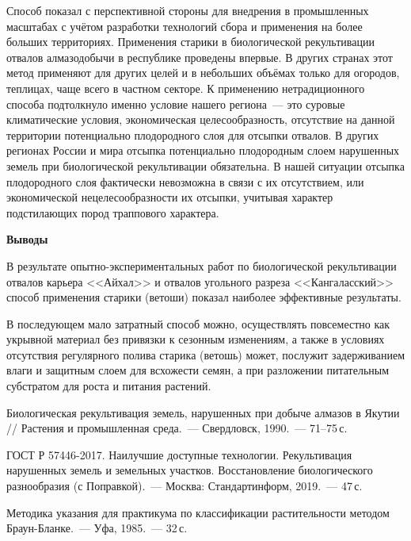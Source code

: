 Способ показал с перспективной стороны для внедрения в промышленных масштабах с учётом разработки технологий сбора и применения на более больших территориях. Применения старики в биологической рекультивации отвалов алмазодобычи в республике проведены впервые. В других странах этот метод применяют для других целей и в небольших объёмах только для огородов, теплицах, чаще всего в частном секторе. К применению нетрадиционного способа подтолкнуло именно условие нашего региона~--- это суровые климатические условия, экономическая целесообразность, отсутствие на данной территории потенциально плодородного слоя для отсыпки отвалов.
\clearpage
В других регионах России и мира отсыпка потенциально плодородным слоем нарушенных земель при биологической рекультивации обязательна. В нашей ситуации отсыпка плодородного слоя фактически невозможна в связи с их отсутствием, или экономической нецелесообразности их отсыпки, учитывая характер подстилающих пород траппового характера.

\textbf{Выводы}

В результате опытно-экспериментальных работ по биологической рекультивации отвалов карьера <<Айхал>> и отвалов угольного разреза <<Кангаласский>> способ применения старики (ветоши) показал наиболее эффективные результаты.

В последующем мало затратный способ можно, осуществлять повсеместно как укрывной материал без привязки к сезонным изменениям, а также в условиях отсутствия регулярного полива старика (ветошь) может, послужит задерживанием влаги и защитным слоем для всхожести семян, а при разложении питательным субстратом для роста и питания растений.

\begin{thebibliography}{99}

\bibitem{}
 Биологическая рекультивация земель, нарушенных при добыче алмазов в Якутии // Растения и промышленная среда.~--- Свердловск, 1990.~--- 71--75\,с.

\bibitem{}
ГОСТ Р 57446-2017. Наилучшие доступные технологии. Рекультивация нарушенных земель и земельных участков. Восстановление биологического разнообразия (с Поправкой).~--- Москва: Стандартинформ, 2019.~--- 47\,с.

\bibitem{}
 Методика указания для практикума по классификации растительности методом Браун-Бланке.~--- Уфа, 1985.~--- 32\,с.
\end{thebibliography}
